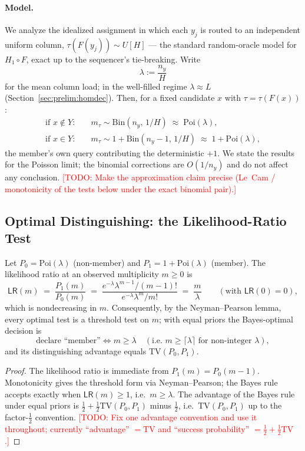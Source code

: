 \documentclass[runningheads]{llncs}
\newcommand{\TODO}[1]{\textcolor{red}{[TODO: #1]}}
\newcommand{\half}{H}                        %
\newcommand{\Poi}{\mathrm{Poi}}
\newcommand{\Bin}{\mathrm{Bin}}
\newcommand{\TV}{\mathrm{TV}}
\newcommand{\LR}{\mathsf{LR}}
\begin{document}
\paragraph{Model.}
We analyze the idealized assignment in which each $y_j$ is routed to an independent
uniform column, $\tau(F(y_j))\sim U[\half]$ --- the standard random-oracle model for
$H_1\circ F$, exact up to the sequencer's tie-breaking. Write
\[
  \lambda:=\frac{n_y}{\half}
\]
for the mean column load; in the well-filled regime $\lambda\approx L$
(Section~\ref{sec:prelim:homdec}). Then, for a fixed candidate $x$ with
$\tau=\tau(F(x))$:
\begin{align*}
  \text{if } x\notin Y:&\quad m_\tau \sim \Bin(n_y,\,1/\half)\;\approx\;\Poi(\lambda),\\
  \text{if } x\in Y:&\quad m_\tau \sim 1+\Bin(n_y-1,\,1/\half)\;\approx\;1+\Poi(\lambda),
\end{align*}
the member's own query contributing the deterministic $+1$. We state the results for
the Poisson limit; the binomial corrections are $O(1/n_y)$ and do not affect any
conclusion. \TODO{Make the approximation claim precise (Le~Cam / monotonicity of the
tests below under the exact binomial pair).}

\subsection{Optimal Distinguishing: the Likelihood-Ratio Test}
\label{sec:leak:lr}

\begin{proposition}\label{prop:lr}
Let $P_0=\Poi(\lambda)$ (non-member) and $P_1=1+\Poi(\lambda)$ (member). The
likelihood ratio at an observed multiplicity $m\ge0$ is
\[
  \LR(m)\;=\;\frac{P_1(m)}{P_0(m)}\;=\;\frac{e^{-\lambda}\lambda^{m-1}/(m-1)!}
  {e^{-\lambda}\lambda^{m}/m!}\;=\;\frac{m}{\lambda}
  \qquad(\text{with }\LR(0)=0),
\]
which is nondecreasing in $m$. Consequently, by the Neyman--Pearson lemma, every
optimal test is a threshold test on $m$; with equal priors the Bayes-optimal decision
is
\[
  \text{declare ``member''}\iff m\ge\lambda
  \quad(\text{i.e.\ }m\ge\lceil\lambda\rceil\text{ for non-integer }\lambda),
\]
and its distinguishing advantage equals $\TV(P_0,P_1)$.
\end{proposition}

\begin{proof}
The likelihood ratio is immediate from $P_1(m)=P_0(m-1)$. Monotonicity gives the
threshold form via Neyman--Pearson; the Bayes rule accepts exactly when $\LR(m)\ge1$,
i.e.\ $m\ge\lambda$. The advantage of the Bayes rule under equal priors is
$\tfrac12+\tfrac12\TV(P_0,P_1)$ minus $\tfrac12$, i.e.\ $\TV(P_0,P_1)$ up to the
factor-$\tfrac12$ convention. \TODO{Fix one advantage convention and use it
throughout; currently ``advantage'' $=\TV$ and ``success probability''
$=\tfrac12+\tfrac12\TV$.}
\end{proof}
\end{document}
